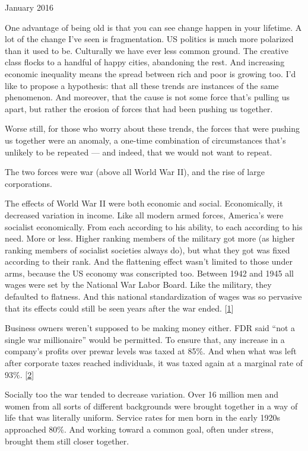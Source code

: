 January 2016

One advantage of being old is that you can see change happen in your
lifetime. A lot of the change I've seen is fragmentation. US politics is
much more polarized than it used to be. Culturally we have ever less
common ground. The creative class flocks to a handful of happy cities,
abandoning the rest. And increasing economic inequality means the spread
between rich and poor is growing too. I'd like to propose a hypothesis:
that all these trends are instances of the same phenomenon. And
moreover, that the cause is not some force that's pulling us apart, but
rather the erosion of forces that had been pushing us together.

Worse still, for those who worry about these trends, the forces that
were pushing us together were an anomaly, a one-time combination of
circumstances that's unlikely to be repeated --- and indeed, that we
would not want to repeat.

The two forces were war (above all World War II), and the rise of large
corporations.

The effects of World War II were both economic and social. Economically,
it decreased variation in income. Like all modern armed forces,
America's were socialist economically. From each according to his
ability, to each according to his need. More or less. Higher ranking
members of the military got more (as higher ranking members of socialist
societies always do), but what they got was fixed according to their
rank. And the flattening effect wasn't limited to those under arms,
because the US economy was conscripted too. Between 1942 and 1945 all
wages were set by the National War Labor Board. Like the military, they
defaulted to flatness. And this national standardization of wages was so
pervasive that its effects could still be seen years after the war
ended. {[}\hyperref[f1n]{1}{]}

Business owners weren't supposed to be making money either. FDR said
``not a single war millionaire'' would be permitted. To ensure that, any
increase in a company's profits over prewar levels was taxed at 85\%.
And when what was left after corporate taxes reached individuals, it was
taxed again at a marginal rate of 93\%. {[}\hyperref[f2n]{2}{]}

Socially too the war tended to decrease variation. Over 16 million men
and women from all sorts of different backgrounds were brought together
in a way of life that was literally uniform. Service rates for men born
in the early 1920s approached 80\%. And working toward a common goal,
often under stress, brought them still closer together.


